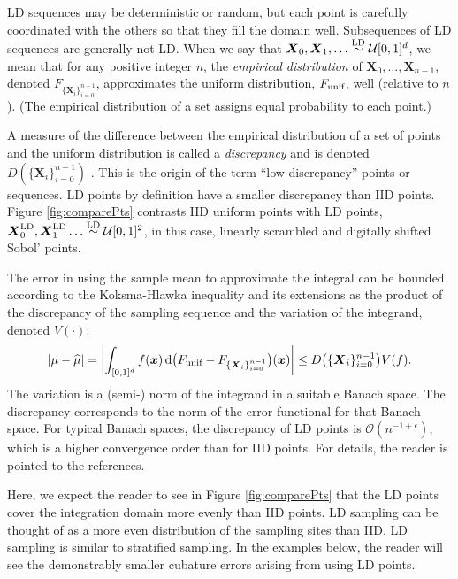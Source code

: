 \documentclass[graybox]{svmult}
\begin{document}
LD sequences may be deterministic or random, but each point is carefully coordinated with the others so that they fill the domain well.  Subsequences of LD sequences are generally not LD.  When we say that $\boldsymbol{X}_0, \boldsymbol{X}_1, \ldots \overset{\textup{LD}}{\sim} \mathcal{U}[0,1]^d$, we mean that for any positive integer $n$,  the \emph{empirical distribution} of $\boldsymbol{X}_0, \ldots, \boldsymbol{X}_{n-1}$, denoted $F_{\{\boldsymbol{X}_i\}_{i=0}^{n-1}}$,  approximates the uniform distribution, $F_{\textup{unif}}$, well (relative to $n$).  (The empirical distribution of a set assigns equal probability to each point.)

A measure of the difference between the empirical distribution of a set of points and the uniform distribution is called a \emph{discrepancy} and is denoted $D(\{\boldsymbol{X}_i\}_{i=0}^{n-1})$ \cite{DicEtal14a,Hic97a,Hic99a,Nie92}.  This is the origin of the term ``low discrepancy'' points or sequences.  LD points by definition have a smaller discrepancy than IID points.  Figure \ref{fig:comparePts} contrasts IID uniform points with LD points, $\boldsymbol{X}^{\textup{LD}}_0, \boldsymbol{X}^{\textup{LD}}_1 \ldots \overset{\textup{LD}}{\sim} \mathcal{U}[0,1]^2$, in this case, linearly scrambled and digitally shifted Sobol' points.

The error in using the sample mean to approximate the integral can be bounded according to the Koksma-Hlawka inequality and its extensions \cite{DicEtal14a,Hic97a,Hic99a,Nie92} as the product of the discrepancy of the sampling sequence and the variation of the integrand, denoted $V(\cdot)$:
\begin{equation}
	\lvert\mu - \widehat{\mu}\rvert = \biggl \lvert \int_{[0,1]^d} f(\boldsymbol{x}) \, \mathrm{d} \bigl(F_{\textup{unif}} - F_{\{\boldsymbol{X}_i\}_{i=0}^{n-1}}\bigr) (\boldsymbol{x}) \biggr \rvert \le D\bigl(\{\boldsymbol{X}_i\}_{i=0}^{n-1}\bigr) V(f).
\end{equation} 
The variation is a (semi-) norm of the integrand in a suitable Banach space.  The discrepancy corresponds to the norm of the error functional for that Banach space.  For typical Banach spaces, the discrepancy of LD points is $\mathcal{O}(n^{-1+\epsilon})$, which is a higher convergence order than for IID points.  For details, the reader is pointed to the references.

Here, we expect the reader to see in Figure \ref{fig:comparePts} that the LD points cover the integration domain more evenly than IID points.  LD sampling can be thought of as a more even distribution of the sampling sites than IID.  LD sampling is similar to stratified sampling.  In the examples below, the reader will see the demonstrably smaller cubature errors arising from using LD points.
\end{document}
